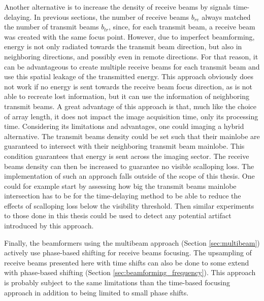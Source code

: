 Another alternative is to increase the density of receive beams by signals time-delaying. In previous sections, the number of receive beams $b_{re}$ always matched the number of transmit beams $b_{tr}$, since, for each transmit beam, a receive beam was created with the same focus point. However, due to imperfect beamforming, energy is not only radiated towards the transmit beam direction, but also in neighboring directions, and possibly even in remote directions.
For that reason, it can be advantageous to create multiple receive beams for each transmit beam and use this spatial leakage of the transmitted energy.
This approach obviously does not work if no energy is sent towards the receive beam focus direction, as is not able to recreate lost information, but it can use the information of neighboring transmit beams. A great advantage of this approach is that, much like the choice of array length, it does not impact the image acquisition time, only its processing time. Considering its limitations and advantages, one could imaging a hybrid alternative. The transmit beams density could be set such that their mainlobe are guaranteed to intersect with their neighboring transmit beam mainlobe. This condition guarantees that energy is sent across the imaging sector. The receive beams density can then be increased to guarantee no visible scalloping loss. The implementation of such an approach falls outside of the scope of this thesis. One could for example start by assessing how big the transmit beams mainlobe intersection has to be for the time-delaying method to be able to reduce the effects of scalloping loss below the visibility threshold. Then similar experiments to those done in this thesis could be used to detect any potential artifact introduced by this approach.

Finally, the beamformers using the multibeam approach (Section \ref{sec:multibeam}) actively use phase-based shifting for receive beams focusing. The upsampling of receive beams presented here with time shifts can also be done to some extend with phase-based shifting (Section \ref{sec:beamforming_frequency}). 
This approach is probably subject to the same limitations than the time-based focusing approach in addition to being limited to small phase shifts.

\fi